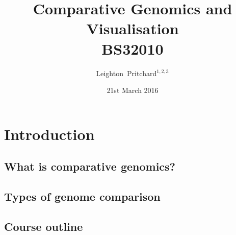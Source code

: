 

%



\title[Comparative Genomics and Visualisation] %
{Comparative Genomics and \\ Visualisation \\
BS32010 \\}
\author[Pritchard] %
{Leighton~Pritchard$^{1,2,3}$}
\date[21st March 2016] %
{21st March 2016}
\subject{Bioinformatics, Genomics, Bacteria, Sequencing, Microbiology, Microbes, Comparative Genomics, Visualisation}





\frame[plain]{\titlepage}



\section{Introduction}

\subsection{What is comparative genomics?}

\subsection{Types of genome comparison}

%
%

\subsection{Course outline}
%




